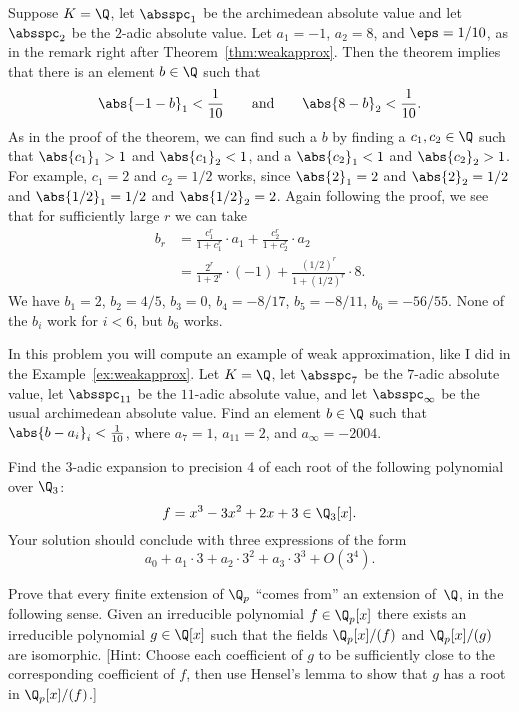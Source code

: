 \documentclass[11pt]{book}
\begin{document}
\begin{ch}
\begin{example}\label{ex:weakapprox}
  Suppose $K=\Q$, let $\absspc_1$ be the archimedean absolute value
  and let $\absspc_2$ be the $2$-adic absolute value.  Let $a_1=-1$,
  $a_2=8$, and $\eps=1/10$, as in the remark right after
  Theorem~\ref{thm:weakapprox}.  Then the theorem implies that there
  is an element $b\in \Q$ such that
$$
 \abs{-1-b}_1 < \frac{1}{10} \qquad\text{and}\qquad \abs{8-b}_2 < \frac{1}{10}.
 $$
 As in the proof of the theorem, we can find such a $b$ by finding
 a $c_1, c_2\in\Q$ such that $\abs{c_1}_1>1$ and $\abs{c_1}_2<1$, and
a $\abs{c_2}_1<1$ and $\abs{c_2}_2>1$.  For example,
 $c_1=2$ and $c_2=1/2$ works, since $\abs{2}_1 = 2$ and $\abs{2}_2 =
 1/2$ and
$\abs{1/2}_1=1/2$ and $\abs{1/2}_2=2$.  Again
 following the proof, we see that for sufficiently large $r$
we can take
\begin{align*}
   b_r &= \frac{c_1^r}{1+c_1^r} \cdot a_1 +
     \frac{c_2^r}{1+c_2^r} \cdot a_2\\
     &=\frac{2^r}{1+2^r} \cdot (-1) +
     \frac{(1/2)^r}{1+(1/2)^r} \cdot 8.
   \end{align*}
We have $b_1 = 2$, $b_2 = 4/5$, $b_3 = 0$, $b_4 = -8/17$,
$b_5 = -8/11$, $b_6 = -56/55$.  None of the $b_i$ work for $i<6$,
but $b_6$ works.
\end{example}

\begin{exercise}\label{ex:topology9}
  In this problem you will compute an example of weak
  approximation, like I did in the Example~\ref{ex:weakapprox}.  Let
  $K=\Q$, let $\absspc_7$ be the $7$-adic absolute value, let
  $\absspc_{11}$ be the $11$-adic absolute value, and let
  $\absspc_{\infty}$ be the usual archimedean absolute value.  Find an
  element $b\in \Q$ such that $\abs{b-a_i}_i<\frac{1}{10}$, where $a_7
  = 1$, $a_{11} = 2$, and $a_{\infty} = -2004$.
\end{exercise}

\begin{exercise}\label{ex:topology10}
Find the $3$-adic expansion to precision 4 of each root of the following polynomial over $\Q_3$:
$$
  f = x^3 - 3x^2 + 2x + 3 \in \Q_3[x].
$$
Your solution should conclude with three expressions of the form
$$a_0 + a_1\cdot 3 + a_2\cdot 3^2 + a_3 \cdot 3^3 + O(3^4).$$
\end{exercise}

\begin{exercise}\label{ex:topology11}
  Prove that every finite extension of
  $\Q_p$ ``comes from'' an extension of~$\Q$, in the following sense.
  Given an irreducible polynomial $f\in\Q_p[x]$ there exists an
  irreducible polynomial $g\in \Q[x]$ such that the fields
  $\Q_p[x]/(f)$ and $\Q_p[x]/(g)$ are isomorphic.  [Hint: Choose each
  coefficient of $g$ to be sufficiently close to the corresponding
  coefficient of $f$, then use Hensel's lemma to show that $g$ has a
  root in $\Q_p[x]/(f)$.]
\end{exercise}


\end{ch}
\end{document}
